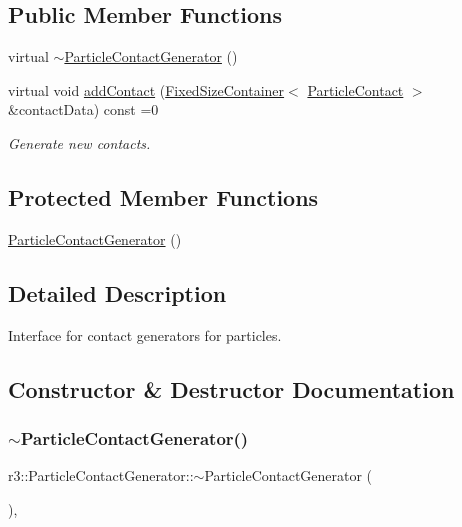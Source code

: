 \subsection*{Public Member Functions}
\begin{DoxyCompactItemize}
\item 
virtual \mbox{\hyperlink{classr3_1_1_particle_contact_generator_af258aa3e7d7fb8e9c9ca7eb545d27738}{$\sim$\+Particle\+Contact\+Generator}} ()
\item 
virtual void \mbox{\hyperlink{classr3_1_1_particle_contact_generator_a39a7a8f0d5b31b1ca2c2ace2af8e2978}{add\+Contact}} (\mbox{\hyperlink{classr3_1_1_fixed_size_container}{Fixed\+Size\+Container}}$<$ \mbox{\hyperlink{classr3_1_1_particle_contact}{Particle\+Contact}} $>$ \&contact\+Data) const =0
\begin{DoxyCompactList}\small\item\em Generate new contacts. \end{DoxyCompactList}\end{DoxyCompactItemize}
\subsection*{Protected Member Functions}
\begin{DoxyCompactItemize}
\item 
\mbox{\hyperlink{classr3_1_1_particle_contact_generator_a3cfeb03fe6fb6a82a64746c0dd9b89f2}{Particle\+Contact\+Generator}} ()
\end{DoxyCompactItemize}


\subsection{Detailed Description}
Interface for contact generators for particles. 

\subsection{Constructor \& Destructor Documentation}
\mbox{\label{classr3_1_1_particle_contact_generator_af258aa3e7d7fb8e9c9ca7eb545d27738}} 
\subsubsection{\texorpdfstring{$\sim$\+Particle\+Contact\+Generator()}{~ParticleContactGenerator()}}
{\footnotesize\ttfamily r3\+::\+Particle\+Contact\+Generator\+::$\sim$\+Particle\+Contact\+Generator (\begin{DoxyParamCaption}{ }\end{DoxyParamCaption})\hspace{0.3cm}{\ttfamily [virtual]}, {\ttfamily [default]}}

